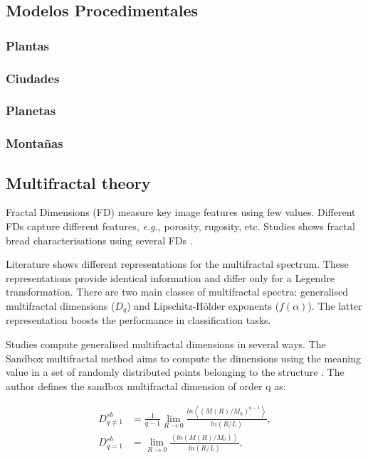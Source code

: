 \documentclass[spanish,a4paper,openright,11pt]{book}
\begin{document}
\subsection{Modelos Procedimentales}
\subsubsection{Plantas}
\subsubsection{Ciudades}
\subsubsection{Planetas}
\subsubsection{Montañas}


\subsection{Multifractal theory}

Fractal Dimensions (FD) measure key image features using few values. Different FDs capture different features, {\em e.g.}, porosity, rugosity, etc. Studies shows fractal bread characterisations using several FDs \cite{Gonzales2008,Baravalle2012}. 

Literature shows different representations for the multifractal spectrum. These representations provide identical information and differ only for a Legendre transformation. There are two main classes of multifractal spectra: generalised multifractal dimensions ($D_{q}$) and Lipschitz-H\"older exponents ($f(\alpha)$). The latter representation boosts the performance in classification tasks.

Studies compute generalised multifractal dimensions in several ways. The Sandbox multifractal method \cite{Tel1989} aims to compute the dimensions using the meaning value in a set of randomly distributed points belonging to the structure \cite{Debartolo2004}. The author defines the sandbox multifractal dimension of order q as:

 \begin{align}
D_{q\ne 1}^{sb} &= \frac{1}{q-1} \lim_{R \rightarrow 0}{
\frac{ln   { \left\langle  (M(R)/M_{0})^{q-1} \right\rangle   }}
{ln {(R/L)}       }},\\
D_{q=1}^{sb} &= \lim_{R \rightarrow 0}{
\frac{ \left\langle ln   { (M(R)/M_{0})  }  \right\rangle}
{ln {(R/L)}       }},
\end{align}
\end{document}
